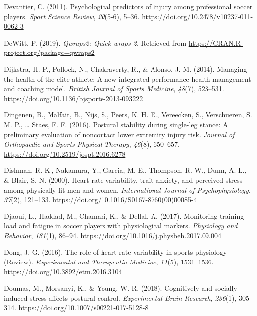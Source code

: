 \documentclass[
  english,
  man,floatsintext]{apa6}
\begin{document}
\leavevmode\hypertarget{ref-Devantier2011}{}%
Devantier, C. (2011). Psychological predictors of injury among professional soccer players. \emph{Sport Science Review}, \emph{20}(5-6), 5--36. \url{https://doi.org/10.2478/v10237-011-0062-3}

\leavevmode\hypertarget{ref-R-qwraps2}{}%
DeWitt, P. (2019). \emph{Qwraps2: Quick wraps 2}. Retrieved from \url{https://CRAN.R-project.org/package=qwraps2}

\leavevmode\hypertarget{ref-Dijkstra2014}{}%
Dijkstra, H. P., Pollock, N., Chakraverty, R., \& Alonso, J. M. (2014). Managing the health of the elite athlete: A new integrated performance health management and coaching model. \emph{British Journal of Sports Medicine}, \emph{48}(7), 523--531. \url{https://doi.org/10.1136/bjsports-2013-093222}

\leavevmode\hypertarget{ref-Dingenen2016}{}%
Dingenen, B., Malfait, B., Nijs, S., Peers, K. H. E., Vereecken, S., Verschueren, S. M. P., \ldots{} Staes, F. F. (2016). Postural stability during single-leg stance: A preliminary evaluation of noncontact lower extremity injury risk. \emph{Journal of Orthopaedic and Sports Physical Therapy}, \emph{46}(8), 650--657. \url{https://doi.org/10.2519/jospt.2016.6278}

\leavevmode\hypertarget{ref-Dishman2000}{}%
Dishman, R. K., Nakamura, Y., Garcia, M. E., Thompson, R. W., Dunn, A. L., \& Blair, S. N. (2000). Heart rate variability, trait anxiety, and perceived stress among physically fit men and women. \emph{International Journal of Psychophysiology}, \emph{37}(2), 121--133. \url{https://doi.org/10.1016/S0167-8760(00)00085-4}

\leavevmode\hypertarget{ref-Djaoui2017}{}%
Djaoui, L., Haddad, M., Chamari, K., \& Dellal, A. (2017). Monitoring training load and fatigue in soccer players with physiological markers. \emph{Physiology and Behavior}, \emph{181}(1), 86--94. \url{https://doi.org/10.1016/j.physbeh.2017.09.004}

\leavevmode\hypertarget{ref-Dong2016a}{}%
Dong, J. G. (2016). The role of heart rate variability in sports physiology (Review). \emph{Experimental and Therapeutic Medicine}, \emph{11}(5), 1531--1536. \url{https://doi.org/10.3892/etm.2016.3104}

\leavevmode\hypertarget{ref-Doumas2018}{}%
Doumas, M., Morsanyi, K., \& Young, W. R. (2018). Cognitively and socially induced stress affects postural control. \emph{Experimental Brain Research}, \emph{236}(1), 305--314. \url{https://doi.org/10.1007/s00221-017-5128-8}
\end{document}
